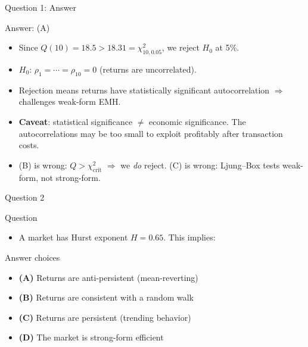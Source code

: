 \documentclass[9pt, aspectratio=169, t]{beamer}
\theoremstyle{definition}
\newenvironment{cminipage}[1]{%
    \par\noindent\hfill\begin{minipage}{#1}\ignorespaces
}{%
    \end{minipage}\hfill\null\par
}
\begin{document}
\begin{frame}{Question 1: Answer}
    \begin{cminipage}{0.95\textwidth}
    \begin{exampleblock}{Answer: (A)}
    \begin{itemize}\setlength\itemsep{1pt}
        \item Since $Q(10) = 18.5 > 18.31 = \chi^2_{10, 0.05}$, we reject $H_0$ at 5\%.
        \item $H_0$: $\rho_1 = \cdots = \rho_{10} = 0$ (returns are uncorrelated).
        \item Rejection means returns have statistically significant autocorrelation $\Rightarrow$ challenges weak-form EMH.
        \item \textbf{Caveat}: statistical significance $\neq$ economic significance. The autocorrelations may be too small to exploit profitably after transaction costs.
        \item (B) is wrong: $Q > \chi^2_{\text{crit}}$ $\Rightarrow$ we \textit{do} reject. (C) is wrong: Ljung--Box tests weak-form, not strong-form.
    \end{itemize}
    \end{exampleblock}
    \end{cminipage}
\end{frame}

\begin{frame}{Question 2}
    \begin{cminipage}{0.95\textwidth}
    \begin{alertblock}{Question}
        \begin{itemize}
            \item A market has Hurst exponent $H = 0.65$. This implies:
        \end{itemize}
    \end{alertblock}

    \vspace{0.3cm}

    \begin{block}{Answer choices}
        \begin{itemize}\setlength{\itemsep}{2pt}
        \item \textcolor{MainBlue}{\textbf{(A)}} Returns are anti-persistent (mean-reverting)
        \item \textcolor{MainBlue}{\textbf{(B)}} Returns are consistent with a random walk
        \item \textcolor{MainBlue}{\textbf{(C)}} Returns are persistent (trending behavior)
        \item \textcolor{MainBlue}{\textbf{(D)}} The market is strong-form efficient
        \end{itemize}
    \end{block}
    \end{cminipage}
\end{frame}
\end{document}
